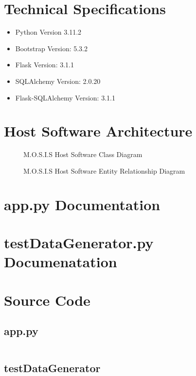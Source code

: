 \documentclass[12pt]{article}
\begin{document}
\section{Technical Specifications}
\begin{itemize}
\item Python Version 3.11.2
\item Bootstrap Version: 5.3.2
\item Flask Version: 3.1.1
\item SQLAlchemy Version: 2.0.20
\item Flask-SQLAlchemy Version: 3.1.1
\end{itemize}
\section{Host Software Architecture}
\begin{figure}[H]
	\caption{M.O.S.I.S Host Software Class Diagram}
\end{figure}
\begin{figure}[H]
	\caption{M.O.S.I.S Host Software Entity Relationship Diagram}
\end{figure}
\section{app.py Documentation}

\section{testDataGenerator.py Documenatation}

\section{Source Code}
\subsection{app.py}
\inputminted{python}{../../../App/app.py}
\subsection{testDataGenerator}
\inputminted{python}{../../../App/testDataGenerator.py}
\end{document}
